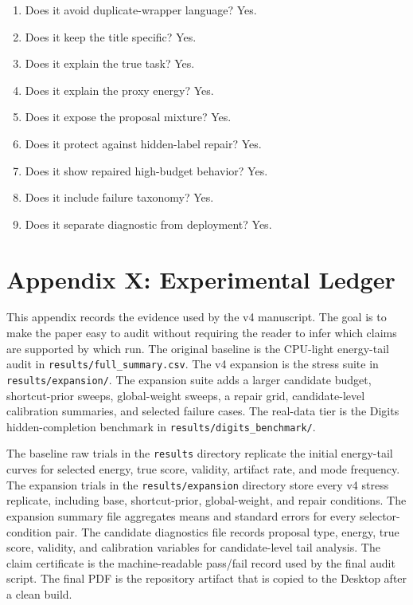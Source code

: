 \documentclass{article}
\begin{document}
\begin{enumerate}
  \item Does it avoid duplicate-wrapper language? Yes.
  \item Does it keep the title specific? Yes.
  \item Does it explain the true task? Yes.
  \item Does it explain the proxy energy? Yes.
  \item Does it expose the proposal mixture? Yes.
  \item Does it protect against hidden-label repair? Yes.
  \item Does it show repaired high-budget behavior? Yes.
  \item Does it include failure taxonomy? Yes.
  \item Does it separate diagnostic from deployment? Yes.
\end{enumerate}

\section{Appendix X: Experimental Ledger}

This appendix records the evidence used by the v4 manuscript. The goal is to
make the paper easy to audit without requiring the reader to infer which
claims are supported by which run. The original baseline is the CPU-light
energy-tail audit in \texttt{results/full\_summary.csv}. The v4 expansion is
the stress suite in \texttt{results/expansion/}. The expansion suite adds a
larger candidate budget, shortcut-prior sweeps, global-weight sweeps, a repair
grid, candidate-level calibration summaries, and selected failure cases. The
real-data tier is the Digits hidden-completion benchmark in
\texttt{results/digits\_benchmark/}.

The baseline raw trials in the \texttt{results} directory replicate the
initial energy-tail curves for selected energy, true score, validity, artifact
rate, and mode frequency. The expansion trials in the
\texttt{results/expansion} directory store every v4 stress replicate,
including base, shortcut-prior, global-weight, and repair conditions. The
expansion summary file aggregates means and standard errors for every
selector-condition pair. The candidate diagnostics file records proposal type,
energy, true score, validity, and calibration variables for candidate-level
tail analysis. The claim certificate is the machine-readable pass/fail record
used by the final audit script. The final PDF is the repository artifact that
is copied to the Desktop after a clean build.
\end{document}
